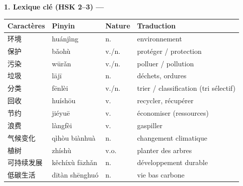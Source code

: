 \documentclass[11pt]{article}
\newcommand{\zh}[1]{\ifmmode\text{#1}\else{#1}\fi}
\begin{document}
\begin{bilan}

\textbf{1. Lexique clé (HSK 2–3) — \zh{重点词汇}}\par
\begin{center}
\begin{tabularx}{\linewidth}{|X|X|X|X|}
\hline
\rowcolor{popblueL} \textbf{Caractères} & \textbf{Pinyin} & \textbf{Nature} & \textbf{Traduction} \\
\hline
环境 & huánjìng & n. & environnement \\
保护 & bǎohù & v./n. & protéger / protection \\
污染 & wūrǎn & v./n. & polluer / pollution \\
垃圾 & lājī & n. & déchets, ordures \\
分类 & fēnlèi & v./n. & trier / classification (tri sélectif) \\
回收 & huíshōu & v. & recycler, récupérer \\
节约 & jiéyuē & v. & économiser (ressources) \\
浪费 & làngfèi & v. & gaspiller \\
气候变化 & qìhòu biànhuà & n. & changement climatique \\
植树 & zhíshù & v.o. & planter des arbres \\
可持续发展 & kěchíxù fāzhǎn & n. & développement durable \\
低碳生活 & dītàn shēnghuó & n. & vie bas carbone \\
\hline
\end{tabularx}
\end{center}


\end{bilan}
\end{document}

